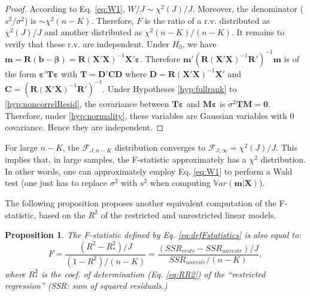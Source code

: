 \documentclass[
  12pt,
]{book}
\newtheorem{proposition}{Proposition}[chapter]
\theoremstyle{definition}
\theoremstyle{definition}
\theoremstyle{definition}
\theoremstyle{definition}
\theoremstyle{remark}
\begin{document}
\begin{proof}
According to Eq. \eqref{eq:W1}, \(W/J \sim \chi^2(J)/J\). Moreover, the denominator (\(s^2/\sigma^2\)) is \(\sim \chi^2(n-K)\). Therefore, \(F\) is the ratio of a r.v. distributed as \(\chi^2(J)/J\) and another distributed as \(\chi^2(n-K)/(n-K)\). It remains to verify that these r.v. are independent. Under \(H_0\), we have \(\mathbf{m} = \mathbf{R}(\mathbf{b}-\boldsymbol\beta) = \mathbf{R}(\mathbf{X}'\mathbf{X})^{-1}\mathbf{X}'\boldsymbol\varepsilon\).
Therefore \(\mathbf{m}'(\mathbf{R}(\mathbf{X}'\mathbf{X})^{-1}\mathbf{R}')^{-1}\mathbf{m}\) is of the form \(\boldsymbol\varepsilon'\mathbf{T}\boldsymbol\varepsilon\) with \(\mathbf{T}=\mathbf{D}'\mathbf{C}\mathbf{D}\) where \(\mathbf{D}=\mathbf{R}(\mathbf{X}'\mathbf{X})^{-1}\mathbf{X}'\) and \(\mathbf{C}=(\mathbf{R}(\mathbf{X}'\mathbf{X})^{-1}\mathbf{R}')^{-1}\). Under Hypotheses \ref{hyp:fullrank} to \ref{hyp:noncorrelResid}, the covariance between \(\mathbf{T}\boldsymbol\varepsilon\) and \(\mathbf{M}\boldsymbol\varepsilon\) is \(\sigma^2\mathbf{T}\mathbf{M} = \mathbf{0}\). Therefore, under \ref{hyp:normality}, these variables are Gaussian variables with 0 covariance. Hence they are independent.
\end{proof}

For large \(n-K\), the \(\mathcal{F}_{J,n-K}\) distribution converges to \(\mathcal{F}_{J,\infty}=\chi^2(J)/J\). This implies that, in large samples, the F-statistic approximately has a \(\chi^2\) distribution. In other words, one can approximately employ Eq. \eqref{eq:W1} to perform a Wald test (one just has to replace \(\sigma^2\) with \(s^2\) when computing \(\mathbb{V}ar(\mathbf{m}|\mathbf{X})\)).

The following proposition proposes another equivalent computation of the F-statistic, based on the \(R^2\) of the restricted and unrestricted linear models.

\begin{proposition}
\protect\hypertarget{prp:Ftest}{}\label{prp:Ftest}The F-statistic defined by Eq. \eqref{eq:defFstatistics} is also equal to:
\begin{equation}
F = \frac{(R^2-R_*^2)/J}{(1-R^2)/(n-K)} =  \frac{(SSR_{restr}-SSR_{unrestr})/J}{SSR_{unrestr}/(n-K)},\label{eq:defFstatistics2}
\end{equation}
where \(R_*^2\) is the coef. of determination (Eq. \eqref{eq:RR2}) of the ``restricted regression'' \emph{(SSR: sum of squared residuals.)}
\end{proposition}
\end{document}
